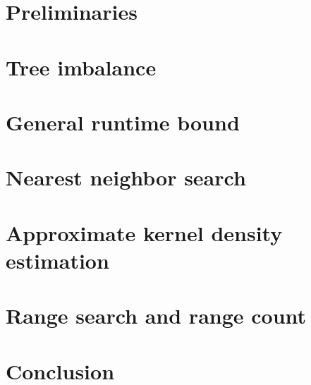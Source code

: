 \documentclass[twoside,11pt]{article} %
\begin{document}
\section{Preliminaries}
\label{sec:preliminaries}



\section{Tree imbalance}
\label{sec:imbalance}



\section{General runtime bound}
\label{sec:bound}



\section{Nearest neighbor search}
\label{sec:nns}



\section{Approximate kernel density estimation}
\label{sec:akde}



\section{Range search and range count}
\label{sec:rs}




%


%

\section{Conclusion}
\label{sec:conclusion}



%


%
\end{document}
